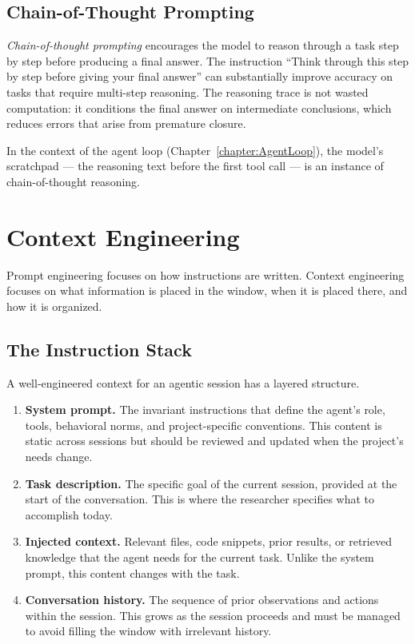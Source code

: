 \subsection{Chain-of-Thought Prompting}

\emph{Chain-of-thought prompting} encourages the model to reason through a task step by step before producing a final answer.
The instruction ``Think through this step by step before giving your final answer'' can substantially improve accuracy on tasks that require multi-step reasoning.
The reasoning trace is not wasted computation: it conditions the final answer on intermediate conclusions, which reduces errors that arise from premature closure.

In the context of the agent loop (Chapter~\ref{chapter:AgentLoop}), the model's scratchpad — the reasoning text before the first tool call — is an instance of chain-of-thought reasoning.

\section{Context Engineering}
\label{section:ContextEngineeringDetail}

Prompt engineering focuses on how instructions are written.
Context engineering focuses on what information is placed in the window, when it is placed there, and how it is organized.

\subsection{The Instruction Stack}

A well-engineered context for an agentic session has a layered structure.

\begin{enumerate}
\item \textbf{System prompt.} The invariant instructions that define the agent's role, tools, behavioral norms, and project-specific conventions.
This content is static across sessions but should be reviewed and updated when the project's needs change.

\item \textbf{Task description.} The specific goal of the current session, provided at the start of the conversation.
This is where the researcher specifies what to accomplish today.

\item \textbf{Injected context.} Relevant files, code snippets, prior results, or retrieved knowledge that the agent needs for the current task.
Unlike the system prompt, this content changes with the task.

\item \textbf{Conversation history.} The sequence of prior observations and actions within the session.
This grows as the session proceeds and must be managed to avoid filling the window with irrelevant history.
\end{enumerate}

